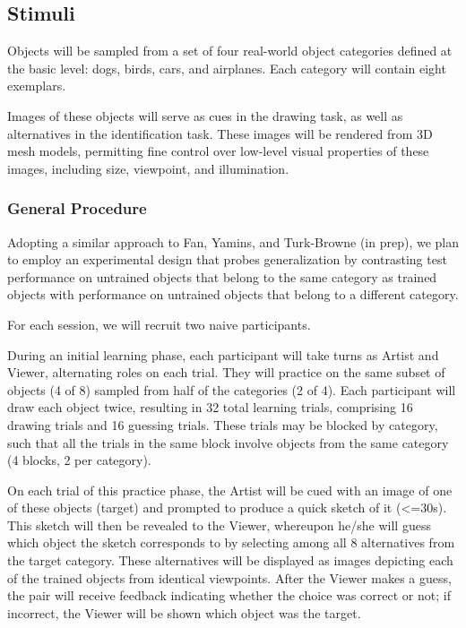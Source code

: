 \documentclass[12pt]{article}
\begin{document}

\subsection{Stimuli}

Objects will be sampled from a set of four real-world object categories defined at the basic level: dogs, birds, cars, and airplanes. Each category will contain eight exemplars. 

Images of these objects will serve as cues in the drawing task, as well as alternatives in the identification task. These images will be rendered from 3D mesh models, permitting fine control over low-level visual properties of these images, including size, viewpoint, and illumination. 

\subsubsection{General Procedure}

Adopting a similar approach to Fan, Yamins, and Turk-Browne (in prep), we plan to employ an experimental design that probes generalization by contrasting test performance on untrained objects that belong to the same category as trained objects with performance on untrained objects that belong to a different category. 

For each session, we will recruit two naive participants. 

During an initial learning phase, each participant will take turns as Artist and Viewer, alternating roles on each trial. They will practice on the same subset of objects (4 of 8) sampled from half of the categories (2 of 4). Each participant will draw each object twice, resulting in 32 total learning trials, comprising 16 drawing trials and 16 guessing trials. These trials may be blocked by category, such that all the trials in the same block involve objects from the same category (4 blocks, 2 per category). 

On each trial of this practice phase, the Artist will be cued with an image of one of these objects (target) and prompted to produce a quick sketch of it (<=30s). This sketch will then be revealed to the Viewer, whereupon he/she will guess which object the sketch corresponds to by selecting among all 8 alternatives from the target category. These alternatives will be displayed as images depicting each of the trained objects from identical viewpoints. After the Viewer makes a guess, the pair will receive feedback indicating whether the choice was correct or not; if incorrect, the Viewer will be shown which object was the target. 
\end{document}
